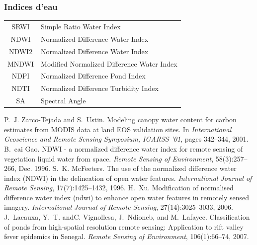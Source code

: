 \documentclass[compress,handout]{beamer}
\begin{document}
\begin{frame}
\frametitle{Indices d'eau}
\footnotesize \centering
\begin{tabular}{|c|l|}
\hline
SRWI & Simple Ratio Water Index \cite{ZarcoTejada2001-SRWI} \\
NDWI & Normalized Difference Water Index  \cite{Gao1996-NDWI} \\
NDWI2 &  Normalized Difference Water Index \cite{McFeeters1996-NDWI2} \\
MNDWI &  Modified Normalized Difference Water Index  \cite{Xu2006-MNDWI} \\
NDPI &  Normalized Difference Pond Index \cite{Lacaux2007-NDTI} \\
NDTI &  Normalized Difference Turbidity Index  \cite{Lacaux2007-NDTI} \\
SA & Spectral Angle \\
\hline
\end{tabular}
\begin{thebibliography}{noidea}
\tiny
{}
P.~J. Zarco-Tejada and S.~Ustin.
 Modeling canopy water content for carbon estimates from {MODIS} data
  at land {EOS} validation sites.
 In {\em International Geoscience and Remote Sensing Symposium, IGARSS
  '01}, pages 342--344, 2001.
B.~cai Gao.
 {NDWI} - a normalized difference water index for remote sensing of
  vegetation liquid water from space.
 {\em Remote Sensing of Environment}, 58(3):257--266,
        Dec. 1996.
S.~K. McFeeters.
 The use of the normalized difference water index ({NDWI}) in the
  delineation of open water features.
 {\em International Journal of Remote Sensing}, 17(7):1425--1432,
  1996.
H.~Xu.
 Modification of normalised difference water index (ndwi) to enhance
  open water features in remotely sensed imagery.
 {\em International Journal of Remote Sensing}, 27(14):3025--3033,
  2006.
J.~Lacauxa, Y.~T. andC. Vignollesa, J.~Ndioneb, and M.~Lafayec.
 Classification of ponds from high-spatial resolution remote sensing:
  Application to rift valley fever epidemics in Senegal.
 {\em Remote Sensing of Environment}, 106(1):66--74, 2007.
\end{thebibliography}
\end{frame}
\end{document}
